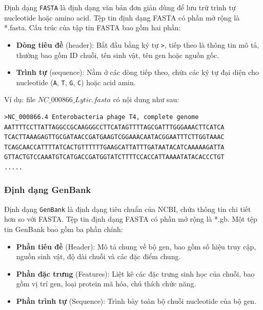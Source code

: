 Định dạng \texttt{FASTA} là định dạng văn bản đơn giản dùng để lưu trữ trình tự nucleotide hoặc amino acid. Tệp tin định dạng FASTA có phần mở rộng là *.fasta. Cấu trúc của tập tin FASTA bao gồm hai phần:

\begin{itemize}
    \item \textbf{Dòng tiêu đề} (header): Bắt đầu bằng ký tự \texttt{>}, tiếp theo là thông tin mô tả, thường bao gồm ID chuỗi, tên sinh vật, tên gen hoặc nguồn gốc.
    \item \textbf{Trình tự} (sequence): Nằm ở các dòng tiếp theo, chứa các ký tự đại diện cho nucleotide (\texttt{A}, \texttt{T}, \texttt{G}, \texttt{C}) hoặc acid amin.
\end{itemize}

\noindent Ví dụ: file $NC\_000866\_Lytic.fasta$ có nội dung như sau:
\begin{verbatim}
>NC_000866.4 Enterobacteria phage T4, complete genome
AATTTTCCTTATTAGGCCGCAAGGGCCTTCATAGTTTTAGCGATTTGGGAAACTTCATCA
TCACTTAAAGAGTTGCGATAACCGATGAAGTCGGAAACAATACGGAATTTCTTGGTAAAC
TCAGCAACCATTTTATCACTGTTTTTTGAAGCATTATTTGATAATACATCAAAAAGATTA
GTTACTGTCCAAATGTCATGACCGATGGTATCTTTTCCACCATTAAAATATACACCCTGT
.....
\end{verbatim}

\subsubsection{Định dạng GenBank}

Định dạng \texttt{GenBank} là định dạng tiêu chuẩn của NCBI, chứa thông tin chi tiết hơn so với FASTA. Tệp tin định dạng FASTA có phần mở rộng là *.gb.  Một tệp tin GenBank bao gồm ba phần chính:

\begin{itemize}
    \item \textbf{Phần tiêu đề} (Header): Mô tả chung về bộ gen, bao gồm số hiệu truy cập, nguồn sinh vật, độ dài chuỗi và các đặc điểm chung.
    \item \textbf{Phần đặc trưng} (Features): Liệt kê các đặc trưng sinh học của chuỗi, bao gồm vị trí gen, loại protein mã hóa, chú thích chức năng.
    \item \textbf{Phần trình tự} (Sequence): Trình bày toàn bộ chuỗi nucleotide của bộ gen.
\end{itemize}

